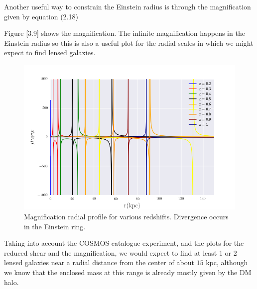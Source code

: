Another useful way to constrain the Einstein radius is through the magnification given by equation (2.18)
 
Figure [3.9] shows the magnification. The infinite magnification happens in the Einstein radius so this is also a useful plot for the radial scales in which we might expect to find lensed galaxies.

\begin{figure}[H]
\centering
\includegraphics[width=12cm]{images/Magnification.png}
\caption[Magnification radial profile]{Magnification radial profile for various redshifts. Divergence occurs in the Einstein ring.}
\end{figure}

Taking into account the COSMOS catalogue experiment, and the plots for the reduced shear and the magnification, we would expect to find at least 1 or 2 lensed galaxies near a radial distance from the center of about $15$ kpc, although we know that the enclosed mass at this range is already mostly given by the DM halo. 

